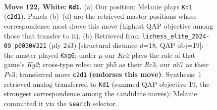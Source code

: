 \documentclass[11pt]{article}
\begin{document}
\begin{figure}[p]\centering
\begin{subfigure}{0.46\textwidth}\centering
\resizebox{\linewidth}{!}{%
\newchessgame
\chessboard[
  setfen={1R6/3r3n/8/4p2p/7b/8/2Kp3k/8 w - - 8 122},
  showmover=false,
  pgfstyle=straightmove, color=movearrow, markmove={c2-d1}
]}
\caption{}
\end{subfigure}\hfill
\begin{subfigure}{0.46\textwidth}\centering
\resizebox{\linewidth}{!}{%
\newchessgame
\chessboard[
  setfen={1R6/6k1/6P1/3B4/8/2r1p2P/8/3R2K1 b - - 0 122},
  showmover=false,
  pgfstyle=straightmove, color=movearrow, markmove={g7-g6}
]}
\caption{}
\end{subfigure}
\\[4pt]

\caption{\textbf{Move 122, White: \texttt{Kd1}.} (a) Our position; Melanie plays \texttt{Kd1} (\texttt{c2d1}). Panels (b)--(d) are the retrieved master positions whose correspondence most drove this move (highest QAP objective among those that transfer to it). (b) Retrieved from \texttt{lichess\_elite\_2024-09\_p0030\#321} (ply 243) [structural distance $d$=18, QAP obj=19]: the master played \texttt{Kxg6}; under $\mu$ our \emph{Kc2} plays the role of that game's \emph{Kg2}; cross-type roles: our \emph{p}h5 as their \emph{R}c3, our \emph{n}h7 as their \emph{P}e3; transferred move \texttt{c2d1} \textbf{(endorses this move)}. Synthesis: 1 retrieved analog transferred to \texttt{Kd1} (summed QAP objective 19, the strongest correspondence among the candidate moves); Melanie committed it via the \texttt{search} selector.}
\label{fig:thought-m242}
\end{figure}

\clearpage
\end{document}
